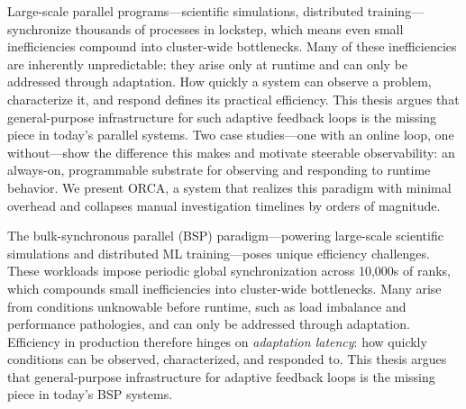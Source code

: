 Large-scale parallel programs—scientific simulations, distributed training—synchronize thousands of
processes in lockstep, which means even small inefficiencies compound into cluster-wide
bottlenecks.
Many of these inefficiencies are inherently unpredictable: they arise only at runtime and can only
be addressed through adaptation.
How quickly a system can observe a problem, characterize it, and respond defines its practical
efficiency.
This thesis argues that general-purpose infrastructure for such adaptive feedback loops is the
missing piece in today's parallel systems.
Two case studies—one with an online loop, one without—show the difference this makes and motivate
steerable observability: an always-on, programmable substrate for observing and responding to
runtime behavior.
We present ORCA, a system that realizes this paradigm with minimal overhead and collapses manual
investigation timelines by orders of magnitude.

The bulk-synchronous parallel (BSP) paradigm---powering large-scale scientific simulations and
distributed ML training---poses unique efficiency challenges.
These workloads impose periodic global synchronization across 10,000s of ranks, which compounds
small inefficiencies into cluster-wide bottlenecks.
Many arise from conditions unknowable before runtime, such as load imbalance and performance
pathologies, and can only be addressed through adaptation.
Efficiency in production therefore hinges on \emph{adaptation latency}: how quickly conditions can
be observed, characterized, and responded to.
This thesis argues that general-purpose infrastructure
for adaptive feedback loops
is the missing piece in today's BSP systems.
